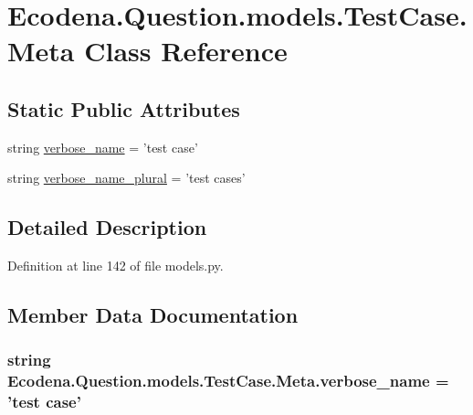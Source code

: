 \hypertarget{class_ecodena_1_1_question_1_1models_1_1_test_case_1_1_meta}{
\section{Ecodena.Question.models.TestCase.Meta Class Reference}
\label{d7/de8/class_ecodena_1_1_question_1_1models_1_1_test_case_1_1_meta}
}
\subsection*{Static Public Attributes}
\begin{DoxyCompactItemize}
\item 
string \hyperlink{class_ecodena_1_1_question_1_1models_1_1_test_case_1_1_meta_abf0e677fcc13a01c9d414e3f49366397}{verbose\_\-name} = 'test case'
\item 
string \hyperlink{class_ecodena_1_1_question_1_1models_1_1_test_case_1_1_meta_a5d437326b1d427e4225daeb42b308535}{verbose\_\-name\_\-plural} = 'test cases'
\end{DoxyCompactItemize}


\subsection{Detailed Description}


Definition at line 142 of file models.py.



\subsection{Member Data Documentation}
\hypertarget{class_ecodena_1_1_question_1_1models_1_1_test_case_1_1_meta_abf0e677fcc13a01c9d414e3f49366397}{
\subsubsection[{verbose\_\-name}]{\setlength{\rightskip}{0pt plus 5cm}string {\bf Ecodena.Question.models.TestCase.Meta.verbose\_\-name} = 'test case'}}
\label{d7/de8/class_ecodena_1_1_question_1_1models_1_1_test_case_1_1_meta_abf0e677fcc13a01c9d414e3f49366397}


